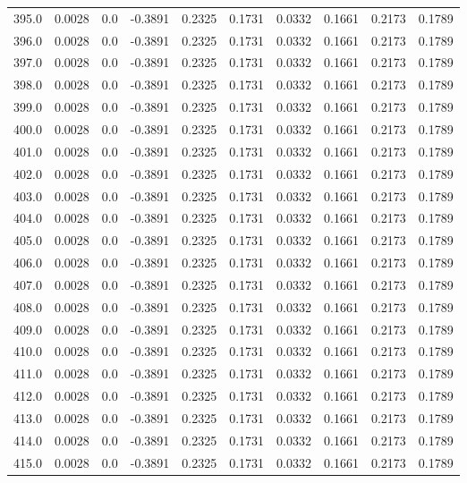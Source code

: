 \begin{longtable}{lrrrrrrrrr}
395.0 & 0.0028 & 0.0 & -0.3891 & 0.2325 & 0.1731 & 0.0332 & 0.1661 & 0.2173 & 0.1789 \\
396.0 & 0.0028 & 0.0 & -0.3891 & 0.2325 & 0.1731 & 0.0332 & 0.1661 & 0.2173 & 0.1789 \\
397.0 & 0.0028 & 0.0 & -0.3891 & 0.2325 & 0.1731 & 0.0332 & 0.1661 & 0.2173 & 0.1789 \\
398.0 & 0.0028 & 0.0 & -0.3891 & 0.2325 & 0.1731 & 0.0332 & 0.1661 & 0.2173 & 0.1789 \\
399.0 & 0.0028 & 0.0 & -0.3891 & 0.2325 & 0.1731 & 0.0332 & 0.1661 & 0.2173 & 0.1789 \\
400.0 & 0.0028 & 0.0 & -0.3891 & 0.2325 & 0.1731 & 0.0332 & 0.1661 & 0.2173 & 0.1789 \\
401.0 & 0.0028 & 0.0 & -0.3891 & 0.2325 & 0.1731 & 0.0332 & 0.1661 & 0.2173 & 0.1789 \\
402.0 & 0.0028 & 0.0 & -0.3891 & 0.2325 & 0.1731 & 0.0332 & 0.1661 & 0.2173 & 0.1789 \\
403.0 & 0.0028 & 0.0 & -0.3891 & 0.2325 & 0.1731 & 0.0332 & 0.1661 & 0.2173 & 0.1789 \\
404.0 & 0.0028 & 0.0 & -0.3891 & 0.2325 & 0.1731 & 0.0332 & 0.1661 & 0.2173 & 0.1789 \\
405.0 & 0.0028 & 0.0 & -0.3891 & 0.2325 & 0.1731 & 0.0332 & 0.1661 & 0.2173 & 0.1789 \\
406.0 & 0.0028 & 0.0 & -0.3891 & 0.2325 & 0.1731 & 0.0332 & 0.1661 & 0.2173 & 0.1789 \\
407.0 & 0.0028 & 0.0 & -0.3891 & 0.2325 & 0.1731 & 0.0332 & 0.1661 & 0.2173 & 0.1789 \\
408.0 & 0.0028 & 0.0 & -0.3891 & 0.2325 & 0.1731 & 0.0332 & 0.1661 & 0.2173 & 0.1789 \\
409.0 & 0.0028 & 0.0 & -0.3891 & 0.2325 & 0.1731 & 0.0332 & 0.1661 & 0.2173 & 0.1789 \\
410.0 & 0.0028 & 0.0 & -0.3891 & 0.2325 & 0.1731 & 0.0332 & 0.1661 & 0.2173 & 0.1789 \\
411.0 & 0.0028 & 0.0 & -0.3891 & 0.2325 & 0.1731 & 0.0332 & 0.1661 & 0.2173 & 0.1789 \\
412.0 & 0.0028 & 0.0 & -0.3891 & 0.2325 & 0.1731 & 0.0332 & 0.1661 & 0.2173 & 0.1789 \\
413.0 & 0.0028 & 0.0 & -0.3891 & 0.2325 & 0.1731 & 0.0332 & 0.1661 & 0.2173 & 0.1789 \\
414.0 & 0.0028 & 0.0 & -0.3891 & 0.2325 & 0.1731 & 0.0332 & 0.1661 & 0.2173 & 0.1789 \\
415.0 & 0.0028 & 0.0 & -0.3891 & 0.2325 & 0.1731 & 0.0332 & 0.1661 & 0.2173 & 0.1789 \\

\end{longtable}
